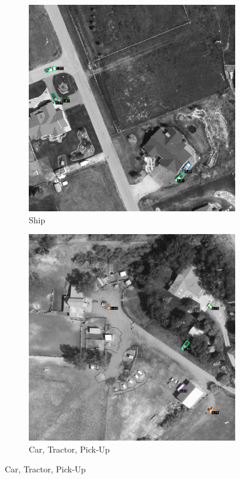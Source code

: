 \begin{figure}[h!]
    \begin{subfigure}[t]{0.38\textwidth}
        \centering
        \includegraphics[width=\linewidth]{images/015Results/03ablation/comp_images/red/509.png}
        \caption{Ship}
    \end{subfigure}
    \begin{subfigure}[t]{0.38\textwidth}
        \centering
        \includegraphics[width=\linewidth]{images/015Results/03ablation/comp_images/red/523.png}
        \caption{Car, Tractor, Pick-Up}
    \end{subfigure}
    

\end{figure}
